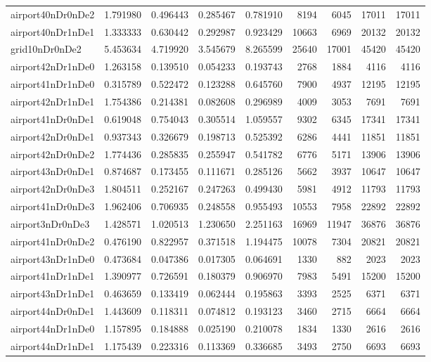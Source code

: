 \begin{longtable}{|l|r|r|r|r|r|r|r|r|}
airport40nDr0nDe2 & 1.791980 & 0.496443 & 0.285467 & 0.781910 & 8194 & 6045 & 17011 & 17011 \\
airport40nDr1nDe1 & 1.333333 & 0.630442 & 0.292987 & 0.923429 & 10663 & 6969 & 20132 & 20132 \\
grid10nDr0nDe2 & 5.453634 & 4.719920 & 3.545679 & 8.265599 & 25640 & 17001 & 45420 & 45420 \\
airport42nDr1nDe0 & 1.263158 & 0.139510 & 0.054233 & 0.193743 & 2768 & 1884 & 4116 & 4116 \\
airport41nDr1nDe0 & 0.315789 & 0.522472 & 0.123288 & 0.645760 & 7900 & 4937 & 12195 & 12195 \\
airport42nDr1nDe1 & 1.754386 & 0.214381 & 0.082608 & 0.296989 & 4009 & 3053 & 7691 & 7691 \\
airport41nDr0nDe1 & 0.619048 & 0.754043 & 0.305514 & 1.059557 & 9302 & 6345 & 17341 & 17341 \\
airport42nDr0nDe1 & 0.937343 & 0.326679 & 0.198713 & 0.525392 & 6286 & 4441 & 11851 & 11851 \\
airport42nDr0nDe2 & 1.774436 & 0.285835 & 0.255947 & 0.541782 & 6776 & 5171 & 13906 & 13906 \\
airport43nDr0nDe1 & 0.874687 & 0.173455 & 0.111671 & 0.285126 & 5662 & 3937 & 10647 & 10647 \\
airport42nDr0nDe3 & 1.804511 & 0.252167 & 0.247263 & 0.499430 & 5981 & 4912 & 11793 & 11793 \\
airport41nDr0nDe3 & 1.962406 & 0.706935 & 0.248558 & 0.955493 & 10553 & 7958 & 22892 & 22892 \\
airport3nDr0nDe3 & 1.428571 & 1.020513 & 1.230650 & 2.251163 & 16969 & 11947 & 36876 & 36876 \\
airport41nDr0nDe2 & 0.476190 & 0.822957 & 0.371518 & 1.194475 & 10078 & 7304 & 20821 & 20821 \\
airport43nDr1nDe0 & 0.473684 & 0.047386 & 0.017305 & 0.064691 & 1330 & 882 & 2023 & 2023 \\
airport41nDr1nDe1 & 1.390977 & 0.726591 & 0.180379 & 0.906970 & 7983 & 5491 & 15200 & 15200 \\
airport43nDr1nDe1 & 0.463659 & 0.133419 & 0.062444 & 0.195863 & 3393 & 2525 & 6371 & 6371 \\
airport44nDr0nDe1 & 1.443609 & 0.118311 & 0.074812 & 0.193123 & 3460 & 2715 & 6664 & 6664 \\
airport44nDr1nDe0 & 1.157895 & 0.184888 & 0.025190 & 0.210078 & 1834 & 1330 & 2616 & 2616 \\
airport44nDr1nDe1 & 1.175439 & 0.223316 & 0.113369 & 0.336685 & 3493 & 2750 & 6693 & 6693 \\

\end{longtable}
